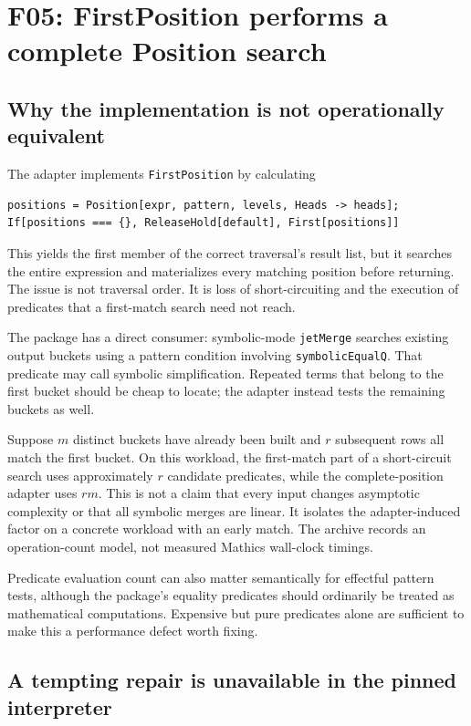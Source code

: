 \documentclass[11pt,letterpaper]{article}
\newcommand{\code}[1]{\texttt{#1}}
\begin{document}
\section{F05: FirstPosition performs a complete Position search}
\label{sec:f05}

\subsection{Why the implementation is not operationally equivalent}

The adapter implements \code{FirstPosition} by calculating
\begin{lstlisting}
positions = Position[expr, pattern, levels, Heads -> heads];
If[positions === {}, ReleaseHold[default], First[positions]]
\end{lstlisting}
This yields the first member of the correct traversal's result list, but it searches the entire expression and materializes every matching position before returning. The issue is not traversal order. It is loss of short-circuiting and the execution of predicates that a first-match search need not reach.~\cite{mathics-compat,mathics-position}

The package has a direct consumer: symbolic-mode \code{jetMerge} searches existing output buckets using a pattern condition involving \code{symbolicEqualQ}. That predicate may call symbolic simplification. Repeated terms that belong to the first bucket should be cheap to locate; the adapter instead tests the remaining buckets as well.~\cite{core}

Suppose $m$ distinct buckets have already been built and $r$ subsequent rows all match the first bucket. On this workload, the first-match part of a short-circuit search uses approximately $r$ candidate predicates, while the complete-position adapter uses $rm$. This is not a claim that every input changes asymptotic complexity or that all symbolic merges are linear. It isolates the adapter-induced factor on a concrete workload with an early match. The archive records an operation-count model, not measured Mathics wall-clock timings.

Predicate evaluation count can also matter semantically for effectful pattern tests, although the package's equality predicates should ordinarily be treated as mathematical computations. Expensive but pure predicates alone are sufficient to make this a performance defect worth fixing.

\subsection{A tempting repair is unavailable in the pinned interpreter}
\end{document}
